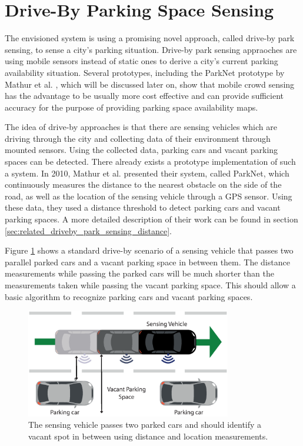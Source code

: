 \section{Drive-By Parking Space Sensing}

The envisioned system is using a promising novel approach, called drive-by park sensing, to sense a city's parking situation. Drive-by park sensing appraoches are using mobile sensors instead of static ones to derive a city's current parking availability situation. Several prototypes, including the ParkNet prototype by Mathur et al. \cite{Mathur:2010:PDS:1814433.1814448}, which will be discussed later on, show that mobile crowd sensing has the advantage to be usually more cost effective and can provide sufficient accuracy for the purpose of providing parking space availability maps. 

The idea of drive-by approaches is that there are sensing vehicles which are driving through the city and collecting data of their environment through mounted sensors. Using the collected data, parking cars and vacant parking spaces can be detected. There already exists a prototype implementation of such a system. In 2010, Mathur et al. \cite{Mathur:2010:PDS:1814433.1814448} presented their system, called ParkNet, which continuously measures the distance to the nearest obstacle on the side of the road, as well as the location of the sensing vehicle through a GPS sensor. Using these data, they used a distance threshold to detect parking cars and vacant parking spaces. A more detailed description of their work can be found in section \ref{sec:related_driveby_park_sensing_distance}.

Figure \ref{fig:driveby_standard_parking_situation} shows a standard drive-by scenario of a sensing vehicle that passes two parallel parked cars and a vacant parking space in between them. The distance measurements while passing the parked cars will be much shorter than the measurements taken while passing the vacant parking space. This should allow a basic algorithm to recognize parking cars and vacant parking spaces.

\begin{figure}
	\centering
	\includegraphics[width=0.8\textwidth]{img/drive-by-parking-situation-pictogram.eps}
	\caption{The sensing vehicle passes two parked cars and should identify a vacant spot in between using distance and location measurements.}
	\label{fig:driveby_standard_parking_situation}
\end{figure}

